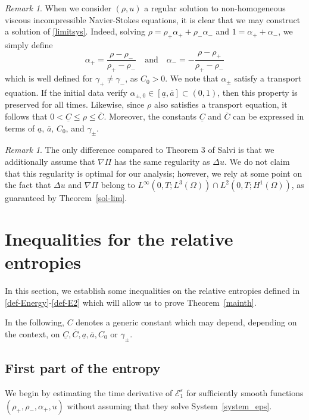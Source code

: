 \documentclass[11pt, twoside, a4paper]{article}
\theoremstyle{plain}
\theoremstyle{remark}
\newtheorem{remark}[theorem]{Remark}
\numberwithin{equation}{section}
\def\EE{{\mathcal E}}
\renewcommand{\leq}{\leqslant}\renewcommand{\le}{\leqslant}
\newcommand{\eps}{\varepsilon}
\newcommand{\ap}{\alpha_+}
\newcommand{\am}{\alpha_-}
\newcommand{\rp}{\rho_+}
\newcommand{\rmi}{\rho_-}
\begin{document}
\begin{remark}\label{rkalpha}
When we consider $(\rho, u)$ a regular solution to non-homogeneous viscous incompressible Navier-Stokes equations, it is clear that we may construct a solution of \eqref{limitsys}. Indeed, solving $\rho=\rp \ap + \rmi \am$ and $1= \ap + \am$, we simply define
\[
\ap = \frac{\rho - \rmi}{\rp-\rmi} \quad\text{and}\quad \am = -\frac{\rho - \rp}{\rp-\rmi}
\]
which is well defined for $\gamma_+\neq \gamma_-$, as $C_0>0$. We note that $\alpha_\pm$ satisfy a transport equation. If the initial data verify $\alpha_{\pm,0} \in [\underline{a}, \overline{a}] \subset (0,1)$, then this property is preserved for all times. Likewise, since $\rho$ also satisfies a transport equation, it follows that $0<\underline{C} \leq \rho \leq \overline{C}$. Moreover, the constants $\underline{C}$ and $\overline{C}$ can be expressed in terms of $\underline{a}$, $\overline{a}$, $C_0$, and $\gamma_\pm$.
\end{remark}

\begin{remark}
The only difference compared to Theorem 3 of Salvi is that we additionally assume that $\nabla \Pi$ has the same regularity as $\Delta u$. We do not claim that this regularity is optimal for our analysis; however, we rely at some point on the fact that $\Delta u$ and $\nabla \Pi$ belong to $L^\infty(0,T;L^3(\Omega))\cap L^2(0,T;H^1(\Omega))$, as guaranteed by Theorem~\ref{sol-lim}.
\end{remark}



\section{Inequalities for the relative entropies}\label{relative_entropy}

In this section, we establish some inequalities on the relative entropies defined in \eqref{def-Energy}-\eqref{def-E2} which will allow us to prove Theorem~\ref{mainth}.

In the following, $C$ denotes a generic constant which may depend, depending on the context, on $\underline{C},\overline{C},\underline{a},\overline{a},C_0$ or $\gamma_\pm$.

\subsection{First part of the entropy}\label{computationsE1}

We begin by estimating the time derivative of $\EE^\eps_1$ for sufficiently smooth functions $(\rho_+,\rho_-,\alpha_+,u)$ without assuming that they solve System~\eqref{system_eps}.
\end{document}
